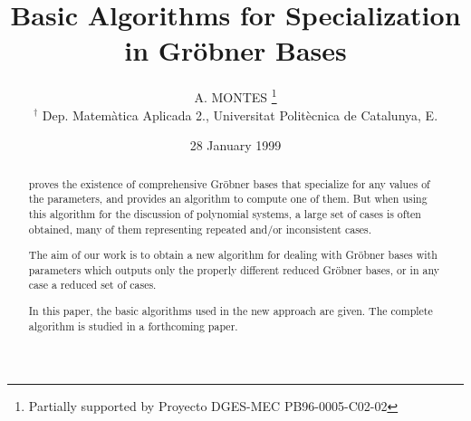 



\newcommand{\nat}{\mathbb{N}}
\newcommand{\ent}{\mathbb{Z}}
\newcommand{\rac}{\hbox{\rm Quot}}
\newcommand{\V}{\mathbb{V}}
\newcommand{\Q}{\hbox{\rm Quot}}
\newcommand{\hs}{\hspace{7mm}}
\newcommand{\vs}{\vspace{5mm}}
\newcommand{\ox}{\overline{x}}
\newcommand{\oa}{\overline{a}}
\newcommand{\lm}{\hbox{\rm lm}}
\newcommand{\lc}{\hbox{\rm lc}}
\newcommand{\lpp}{\hbox{\rm lpp}}
\newcommand{\Gr}{Gr\"obner }

\newtheorem{prop}{Proposition}
\newtheorem{defi}[prop]{Definition}
\newtheorem{teo}[prop]{Theorem}

\newtheorem{lemma}{Lemma}


\title[Specialization in \Gr Basis]{Basic Algorithms
for Specialization in \Gr Bases}
\author[A. Montes]{{A. MONTES
\thanks{Partially supported by Proyecto DGES-MEC
PB96-0005-C02-02 }} \\ $^{\dagger}$ Dep. Matem\`atica Aplicada 2.,
Universitat
Polit\`ecnica de Catalunya, E.} %

\date{28 January 1999}



\maketitle

\begin{abstract}
 proves the existence of comprehensive \Gr bases
that specialize for any values of the parameters, and provides an
algorithm to compute one of them. But when using this algorithm
for the discussion of polynomial systems, a large set of cases is
often obtained, many of them representing repeated and/or
inconsistent cases.

The aim of our work is to obtain a new algorithm for dealing with
\Gr bases with parameters which outputs only the properly
different reduced \Gr bases, or in any case a reduced set of
cases.

In this paper, the basic algorithms used in the new approach are
given. The complete algorithm is studied in a forthcoming paper.
\end{abstract}


